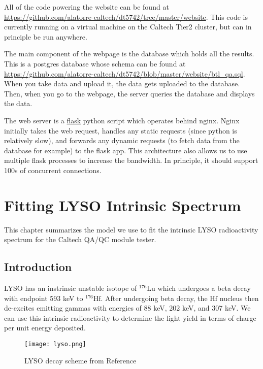 \documentclass[12pt,openright,twoside]{report}
\begin{document}
All of the code powering the website can be found at
\url{https://github.com/alatorre-caltech/dt5742/tree/master/website}. This code
is currently running on a virtual machine on the Caltech Tier2 cluster, but can
in principle be run anywhere.

The main component of the webpage is the database which holds all the results.
This is a postgres database whose schema can be found at
\url{https://github.com/alatorre-caltech/dt5742/blob/master/website/btl_qa.sql}.
When you take data and upload it, the data gets uploaded to the database. Then,
when you go to the webpage, the server queries the database and displays the
data.

The web server is a \href{https://flask.palletsprojects.com/en/2.3.x/}{flask}
python script which operates behind nginx. Nginx initially takes the web
request, handles any static requests (since python is relatively slow), and
forwards any dynamic requests (to fetch data from the database for example) to
the flask app. This architecture also allows us to use multiple flask processes
to increase the bandwidth. In principle, it should support 100s of concurrent
connections.

\chapter{Fitting LYSO Intrinsic Spectrum}
This chapter summarizes the model we use to fit the intrinsic LYSO
radioactivity spectrum for the Caltech QA/QC module tester.
\section{Introduction}
LYSO has an instrinsic unstable isotope of $^{176}\mathrm{Lu}$ which undergoes
a beta decay with endpoint 593 keV to $^{176}\mathrm{Hf}$\cite{sanchez}. After
undergoing beta decay, the $\mathrm{Hf}$ nucleus then de-excites emitting
gammas with energies of 88 keV, 202 keV, and 307 keV. We can use this intrinsic
radioactivity to determine the light yield in terms of charge per unit energy
deposited.

\begin{figure}
\centering
\texttt{[image: lyso.png]}
\caption{LYSO decay scheme from Reference~\cite{sanchez}}
\end{figure}
\end{document}
